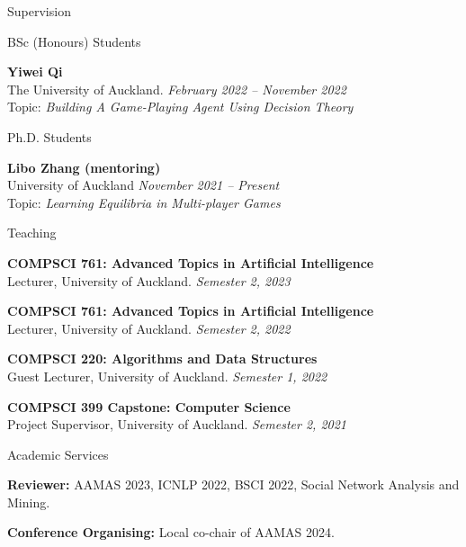 \documentclass{resume} %
\begin{document}
\begin{rSection}{Supervision}
	\begin{rSubsection}{BSc (Honours) Students}{}{}{}
		\item {\bf Yiwei Qi}\\ The University of Auckland. \hfill {\em February 2022 -- November 2022} \\Topic: {\em Building A Game-Playing Agent Using Decision Theory}
	\end{rSubsection}
	\begin{rSubsection}{Ph.D. Students}{}{}{}
		\item {\bf Libo Zhang (mentoring)}\\ University of Auckland \hfill {\em November 2021 -- Present} \\Topic: {\em Learning Equilibria in Multi-player Games}
	\end{rSubsection}
\end{rSection}

\begin{rSection}{Teaching}
	\begin{rSubsection}{}{}{}{}
	\item {\bf COMPSCI 761: Advanced Topics in Artificial Intelligence}\\ Lecturer, University of Auckland. \hfill {\em Semester 2, 2023}
	\item {\bf COMPSCI 761: Advanced Topics in Artificial Intelligence}\\ Lecturer, University of Auckland. \hfill {\em Semester 2, 2022}
		\item {\bf COMPSCI 220: Algorithms and Data Structures}\\ Guest Lecturer, University of Auckland. \hfill {\em Semester 1, 2022} 
		\item {\bf COMPSCI 399 Capstone: Computer Science}\\ Project Supervisor, University of Auckland. \hfill {\em Semester 2, 2021}
	\end{rSubsection}
\end{rSection}

\begin{rSection}{Academic Services}
	\begin{rSubsection}{}{}{}{}
		\item {\bf Reviewer:} AAMAS 2023, ICNLP 2022, BSCI 2022, Social Network Analysis and Mining.		
		\item {\bf Conference Organising:} Local co-chair of AAMAS 2024.
	\end{rSubsection}
\end{rSection}
\end{document}
